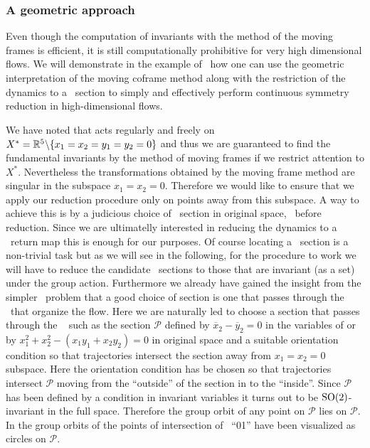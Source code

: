 \subsubsection{A geometric approach}
\label{laserMFnum}

Even though the computation of invariants with the method of the moving frames is efficient,
it is still computationally prohibitive for very high dimensional flows. We will demonstrate
in the example of \CLe\ how one can use the geometric interpretation of the moving coframe method
along with the restriction of the dynamics to a \Poincare\ section to simply and effectively
perform continuous symmetry reduction in high-dimensional flows.

We have noted that  acts regularly and freely on $X^*=\mathbb{R}^{5}\backslash\{x_1=x_2=y_1=y_2=0\}$ and
thus we are guaranteed to find the fundamental invariants by the method of moving frames
if we restrict attention to $X^*$. Nevertheless the transformations 
obtained by the moving frame method are singular in the subspace $x_1=x_2=0$. Therefore
we would like to ensure that we apply our reduction procedure only on points away from this
subspace. A way to achieve this is by a judicious choice of \Poincare\ section in original space,
\ie~before reduction. Since we are ultimatelly interested in reducing the dynamics to a \Poincare\
return map this is enough for our purposes. Of course locating a \Poincare\ section is a non-trivial
task but as we will see in the following, for the procedure to work we will
have to reduce the candidate \Poincare\ sections to those that are invariant (as a set) under
the group action. Furthermore we already have gained the insight from the simpler \Le\ problem
that a good choice of section is one that passes through the \eqva\ that organize the flow.
Here we are naturally led to choose a section that passes through the \reqv~\REQB{1} such as the
section $\mathcal{P}$ defined by $\overline{x}_2-\overline{y}_2=0$ in the variables of
\refeq{eq:invLaser} or by $x_1^2+x_2^2-(x_1 y_1 + x_2 y_2)=0$ in original space and
a suitable orientation condition so that trajectories intersect the section away from
$x_1=x_2=0$ subspace. Here the orientation condition has be chosen so that trajectories intersect
$\mathcal{P}$ moving from the ``outside'' of the section in \reffig{fig:CLEmartini} to the
``inside''.
Since $\mathcal{P}$ has been defined by a condition in invariant variables 
it turns out to be $\mathrm{SO}(2)$-invariant in the full space. Therefore the group orbit of any point on
$\mathcal{P}$ lies on $\mathcal{P}$. In \reffig{fig:CLEmartini} the group orbits of the points
of intersection of \rpo~``01'' have been visualized as circles on $\mathcal{P}$.

